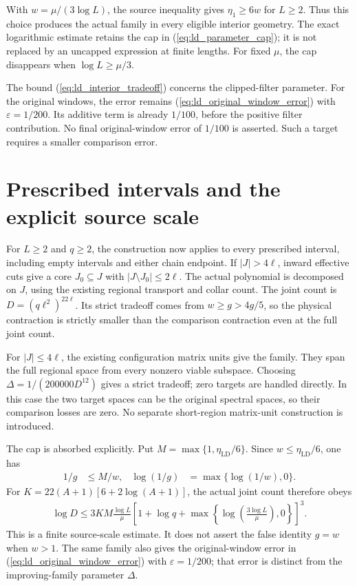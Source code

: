 \documentclass{article}
\begin{document}
With $w=\mu/(3\log L)$, the source inequality gives $\eta_1\ge6w$ for
$L\ge2$. Thus this choice produces the actual family in every eligible
interior geometry. The exact logarithmic estimate retains the cap in
(\ref{eq:ld_parameter_cap}); it is not replaced by an uncapped expression
at finite lengths. For fixed $\mu$, the cap disappears when
$\log L\ge\mu/3$.

The bound (\ref{eq:ld_interior_tradeoff}) concerns the clipped-filter
parameter. For the original windows, the error remains
(\ref{eq:ld_original_window_error}) with $\varepsilon=1/200$.
Its additive term is already $1/100$, before the positive filter
contribution. No final original-window error of $1/100$ is asserted.
Such a target requires a smaller comparison error.

\section{Prescribed intervals and the explicit source scale}

For $L\ge2$ and $q\ge2$, the construction now applies to every prescribed
interval, including empty intervals and either chain endpoint. If
$|J|>4\ell$, inward effective cuts give a core $J_0\subseteq J$ with
$|J\setminus J_0|\le2\ell$. The actual polynomial is decomposed on $J$,
using the existing regional transport and collar count. The joint count is
$D=(q\ell^2)^{22\ell}$. Its strict tradeoff comes from
$w\ge g>4g/5$, so the physical contraction is strictly smaller than the
comparison contraction even at the full joint count.

For $|J|\le4\ell$, the existing configuration matrix units give the
family. They span the full regional space from every nonzero viable
subspace. Choosing $\Delta=1/(200000D^{12})$ gives a strict tradeoff;
zero targets are handled directly. In this case the two target spaces can
be the original spectral spaces, so their comparison losses are zero.
No separate short-region matrix-unit construction is introduced.

The cap is absorbed explicitly. Put $M=\max\{1,\eta_{\mathrm{LD}}/6\}$.
Since $w\le\eta_{\mathrm{LD}}/6$, one has
\begin{align}
    1/g&\le M/w,& \log(1/g)&=\max\{\log(1/w),0\}.
    \label{eq:ld_cap_absorption}
\end{align}
For $K=22(A+1)[6+2\log(A+1)]$, the actual joint count therefore obeys
\begin{align}
    \log D\le 3KM\frac{\log L}{\mu}
      \left[1+\log q+
        \max\left\{\log\left(\frac{3\log L}{\mu}\right),0\right\}\right]^3.
    \label{eq:ld_all_interval_source_count}
\end{align}
This is a finite source-scale estimate. It does not assert the false
identity $g=w$ when $w>1$. The same family also gives the original-window
error in (\ref{eq:ld_original_window_error}) with $\varepsilon=1/200$;
that error is distinct from the improving-family parameter $\Delta$.
\end{document}
